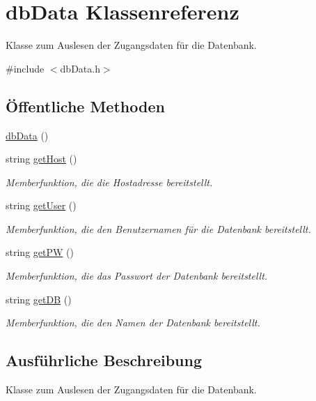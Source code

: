 \hypertarget{classdbData}{\section{db\-Data Klassenreferenz}
\label{classdbData}
}


Klasse zum Auslesen der Zugangsdaten für die Datenbank.  




{\ttfamily \#include $<$db\-Data.\-h$>$}

\subsection*{Öffentliche Methoden}
\begin{DoxyCompactItemize}
\item 
\hyperlink{classdbData_a956b366e8ba336b1ce92b7e199297990}{db\-Data} ()
\item 
string \hyperlink{classdbData_ace04e0d01cf38795aedd7e45ec55a770}{get\-Host} ()
\begin{DoxyCompactList}\small\item\em Memberfunktion, die die Hostadresse bereitstellt. \end{DoxyCompactList}\item 
string \hyperlink{classdbData_ad86749e31e3b786266fb3d10bb8c0b14}{get\-User} ()
\begin{DoxyCompactList}\small\item\em Memberfunktion, die den Benutzernamen für die Datenbank bereitstellt. \end{DoxyCompactList}\item 
string \hyperlink{classdbData_ad27f68087763a858073688098717a0c2}{get\-P\-W} ()
\begin{DoxyCompactList}\small\item\em Memberfunktion, die das Passwort der Datenbank bereitstellt. \end{DoxyCompactList}\item 
string \hyperlink{classdbData_acbdfb09ee706014a5570638e0301ae85}{get\-D\-B} ()
\begin{DoxyCompactList}\small\item\em Memberfunktion, die den Namen der Datenbank bereitstellt. \end{DoxyCompactList}\end{DoxyCompactItemize}


\subsection{Ausführliche Beschreibung}
Klasse zum Auslesen der Zugangsdaten für die Datenbank. 

